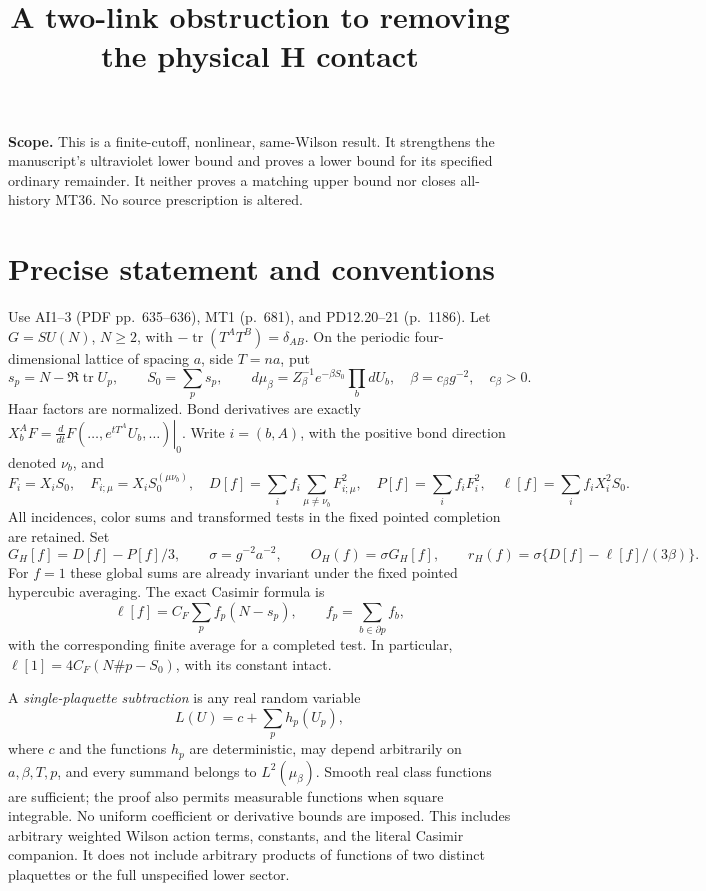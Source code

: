 \documentclass[11pt]{article}
\title{A two-link obstruction to removing the physical H contact}\author{}\date{}
\begin{document}
\maketitle
\noindent\textbf{Scope.} This is a finite-cutoff, nonlinear, same-Wilson result.
It strengthens the manuscript's ultraviolet lower bound and proves a lower
bound for its specified ordinary remainder. It neither proves a matching
upper bound nor closes all-history MT36. No source prescription is altered.


\section{Precise statement and conventions}
Use AI1--3 (PDF pp.~635--636), MT1 (p.~681), and PD12.20--21 (p.~1186).
Let $G=SU(N)$, $N\ge2$, with $-\operatorname{tr}(T^AT^B)=\delta_{AB}$.
On the periodic four-dimensional lattice of spacing $a$, side $T=na$, put
\[
 s_p=N-\Re\operatorname{tr}U_p,\qquad
 S_0=\sum_p s_p,\qquad
 d\mu_\beta=Z_\beta^{-1}e^{-\beta S_0}\prod_b dU_b,
 \quad \beta=c_\beta g^{-2},\quad c_\beta>0.
\]
Haar factors are normalized. Bond derivatives are exactly
$X_b^AF=\left.\frac d{dt}F(\ldots,e^{tT^A}U_b,\ldots)\right|_{0}$.
Write $i=(b,A)$, with the positive bond direction denoted $\nu_b$, and
\[
 F_i=X_iS_0,\quad F_{i;\mu}=X_iS_0^{(\mu\nu_b)},\quad
 D[f]=\sum_i f_i\sum_{\mu\ne\nu_b}F_{i;\mu}^2,\quad
 P[f]=\sum_i f_iF_i^2,\quad \ell[f]=\sum_i f_iX_i^2S_0.
\]
All incidences, color sums and transformed tests in the fixed pointed
completion are retained. Set
\[
 G_H[f]=D[f]-P[f]/3,\qquad \sigma=g^{-2}a^{-2},\qquad
 O_H(f)=\sigma G_H[f],\qquad
 r_H(f)=\sigma\{D[f]-\ell[f]/(3\beta)\}.
\]
For $f=1$ these global sums are already invariant under the fixed pointed
hypercubic averaging. The exact Casimir formula is
\begin{equation}\label{casimir}
 \ell[f]=C_F\sum_p f_p(N-s_p),\qquad f_p=\sum_{b\in\partial p}f_b,
\end{equation}
with the corresponding finite average for a completed test. In particular,
$\ell[1]=4C_F(N\#p-S_0)$, with its constant intact.

A \emph{single-plaquette subtraction} is any real random variable
\begin{equation}\label{lower}
 L(U)=c+\sum_p h_p(U_p),
\end{equation}
where $c$ and the functions $h_p$ are deterministic, may depend arbitrarily
on $a,\beta,T,p$, and every summand belongs to $L^2(\mu_\beta)$. Smooth real class functions
are sufficient; the proof also permits measurable functions when square
integrable. No uniform coefficient or derivative bounds are imposed.
This includes arbitrary weighted Wilson action terms, constants, and the
literal Casimir companion. It does not include arbitrary products of
functions of two distinct plaquettes or the full unspecified lower sector.
\end{document}

